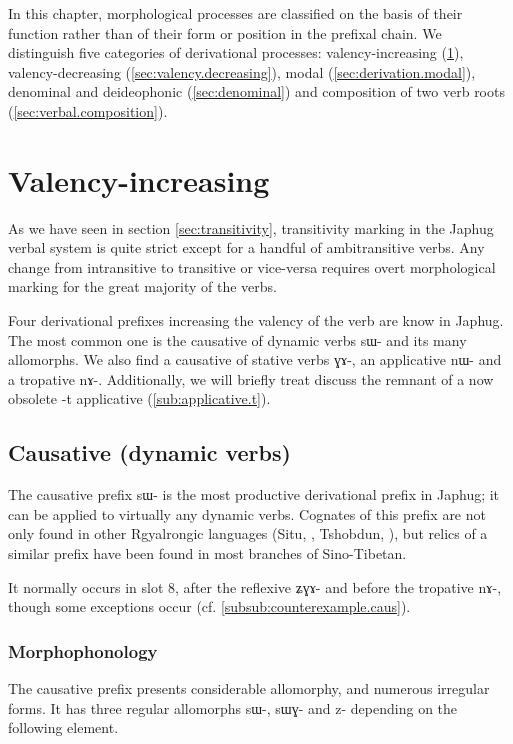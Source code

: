 \documentclass[oldfontcommands,oneside,a4paper,11pt]{memoir}
\newcommand{\ipa}[1]{{\phon #1}} %
\begin{document}
In this chapter, morphological processes are classified on the basis of their function rather than of their form or position in the prefixal chain. We distinguish five categories of derivational processes: valency-increasing (\ref{sec:valency.increasing}), valency-decreasing (\ref{sec:valency.decreasing}), modal (\ref{sec:derivation.modal}), denominal and deideophonic (\ref{sec:denominal}) and composition of two verb roots (\ref{sec:verbal.composition}).


\section{Valency-increasing} \label{sec:valency.increasing}
As we have seen in section \ref{sec:transitivity}, transitivity marking in the Japhug verbal system is quite strict except for a handful of ambitransitive verbs. Any change from intransitive to transitive or vice-versa requires overt morphological marking for the great majority of the verbs.

Four derivational prefixes increasing the valency of the verb are know in Japhug. The most common one is the causative of dynamic verbs \ipa{sɯ-} and its many allomorphs. We also find a causative of stative verbs \ipa{ɣɤ-}, an applicative \ipa{nɯ-} and a tropative \ipa{nɤ-}. Additionally, we will briefly treat discuss the remnant of a now obsolete \ipa{-t} applicative (\ref{sub:applicative.t}).

\subsection{Causative (dynamic verbs)} \label{sub:caus1}
The causative prefix \ipa{sɯ-} is the most productive derivational prefix in Japhug; it can be applied to virtually any dynamic verbs. Cognates of this prefix are not only found in other Rgyalrongic languages (Situ, \citet{linxr93jiarong}, Tshobdun, \citet{jackson06paisheng}), but relics of a similar prefix have been found in most branches of Sino-Tibetan.

It normally occurs in slot 8, after the reflexive \ipa{ʑɣɤ-} and before the tropative \ipa{nɤ-}, though some exceptions occur (cf. \ref{subsub:counterexample.caus}).

\subsubsection{Morphophonology} \label{subsub:caus:morphophon}
The causative prefix presents  considerable allomorphy, and numerous irregular forms. It has three regular allomorphs \ipa{sɯ-}, \ipa{sɯɣ-} and \ipa{z-} depending on the following element.
\end{document}
